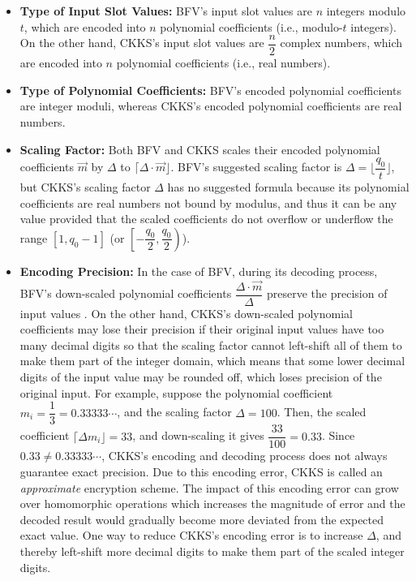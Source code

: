 \begin{itemize}
\item \textbf{Type of Input Slot Values:} BFV's input slot values are ${n}$ integers modulo $t$, which are encoded into $n$ polynomial coefficients (i.e., modulo-$t$ integers). On the other hand, CKKS's input slot values are $\dfrac{n}{2}$ complex numbers, which are encoded into $n$ polynomial coefficients (i.e., real numbers). 

\item \textbf{Type of Polynomial Coefficients:} BFV's encoded polynomial coefficients are integer moduli, whereas CKKS's encoded polynomial coefficients are real numbers. 

\item \textbf{Scaling Factor:} Both BFV and CKKS scales their encoded polynomial coefficients $\vec{m}$ by $\Delta$ to $\lceil \Delta\cdot \vec{m} \rfloor$. BFV's suggested scaling factor is $\Delta = \lfloor\dfrac{q_0}{t}\rfloor$, but CKKS's scaling factor $\Delta$ has no suggested formula because its polynomial coefficients are real numbers not bound by modulus, and thus it can be any value provided that the scaled coefficients do not overflow or underflow the range $[1, q_0 - 1]$ (or $\left[-\dfrac{q_0}{2}, \dfrac{q_0}{2}\right)$). 

\item \textbf{Encoding Precision:} In the case of BFV, during its decoding process, BFV's down-scaled polynomial coefficients $\dfrac{ \Delta\cdot \vec{m} }{\Delta}$ preserve the precision of input values 
. On the other hand, CKKS's down-scaled polynomial coefficients may lose their precision if their original input values have too many decimal digits so that the scaling factor cannot left-shift all of them to make them part of the integer domain, which means that some lower decimal digits of the input value may be rounded off, which loses precision of the original input. For example, suppose the polynomial coefficient $m_i = \dfrac{1}{3} = 0.33333\cdots$, and the scaling factor $\Delta = 100$. Then, the scaled coefficient $\lceil \Delta m_i \rfloor = 33$, and down-scaling it gives $\dfrac{33}{100} = 0.33$. Since $0.33 \neq 0.33333\cdots$, CKKS's encoding and decoding process does not always guarantee exact precision. Due to this encoding error, CKKS is called an \textit{approximate} encryption scheme. The impact of this encoding error can grow over homomorphic operations which increases the magnitude of error and the decoded result would gradually become more deviated from the expected exact value. One way to reduce CKKS's encoding error is to increase $\Delta$, and thereby left-shift more decimal digits to make them part of the scaled integer digits.  

\end{itemize}

